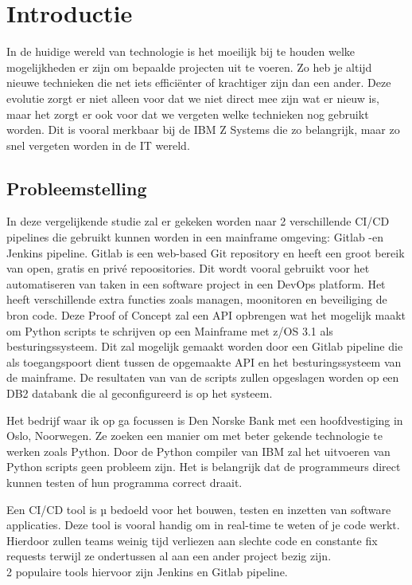 
\section{Introductie}%
\label{sec:introductie}
In de huidige wereld van technologie is het moeilijk bij te houden welke mogelijkheden er zijn om bepaalde projecten uit te voeren. Zo heb je altijd nieuwe technieken die net iets efficiënter of krachtiger zijn dan een ander. Deze evolutie zorgt er niet alleen voor dat we niet direct mee zijn wat er nieuw is, maar het zorgt er ook voor dat we vergeten welke technieken nog gebruikt worden. Dit is vooral merkbaar bij de IBM Z Systems die zo belangrijk, maar zo snel vergeten worden in de IT wereld.


\subsection{Probleemstelling}
In deze vergelijkende studie zal er gekeken worden naar 2 verschillende CI/CD pipelines die gebruikt kunnen worden in een mainframe omgeving: Gitlab -en Jenkins pipeline. 
Gitlab is een web-based Git repository en heeft een groot bereik van open, gratis en privé repoositories. Dit wordt vooral gebruikt voor het automatiseren van taken in een software project in een DevOps platform. Het heeft verschillende extra functies zoals managen, moonitoren en beveiliging de bron code. \autocite{Mo}
Deze Proof of Concept zal een API opbrengen wat het mogelijk maakt om Python scripts te schrijven op een Mainframe met z/OS 3.1 als besturingssysteem. Dit zal mogelijk gemaakt worden door een Gitlab pipeline die als toegangspoort dient tussen de opgemaakte API en het besturingssysteem van de mainframe. De resultaten van van de scripts zullen opgeslagen worden op een DB2 databank die al geconfigureerd is op het systeem.
 
Het bedrijf waar ik op ga focussen is Den Norske Bank met een hoofdvestiging in Oslo, Noorwegen. Ze zoeken een manier om met beter gekende technologie te werken zoals Python. Door de Python compiler van IBM zal het uitvoeren van Python scripts geen probleem zijn. Het is belangrijk dat de programmeurs direct kunnen testen of hun programma correct draait.

Een CI/CD tool is µ bedoeld voor het bouwen, testen en inzetten van software applicaties. Deze tool is vooral handig om in real-time te weten of je code werkt. Hierdoor zullen teams weinig tijd verliezen aan slechte code en constante fix requests terwijl ze ondertussen al aan een ander project bezig zijn. \autocite{Poberezhnyk2023} \\
2 populaire tools hiervoor zijn Jenkins en Gitlab pipeline. \autocite{Mohanan2023} 

